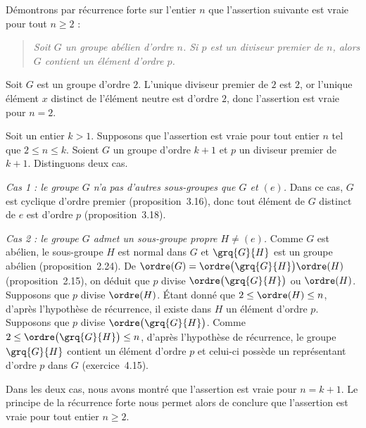
Démontrons par récurrence forte sur l'entier $n$ que l'assertion suivante est vraie pour tout $n \geq 2$ :
\begin{quote}\itshape
  Soit $G$ un groupe abélien d'ordre $n$.
  Si $p$ est un diviseur premier de $n$, alors $G$ contient un élément d'ordre $p$.
\end{quote}

Soit $G$ est un groupe d'ordre $2$.
L'unique diviseur premier de $2$ est $2$, or l'unique élément $x$ distinct de l'élément neutre est d'ordre $2$, donc l'assertion est vraie pour $n = 2$.

Soit un entier $k > 1$.
Supposons que l'assertion est vraie pour tout entier $n$ tel que $2\leq n\leq k$.
Soient $G$ un groupe d'ordre $k + 1$ et $p$ un diviseur premier de $k + 1$.
Distinguons deux cas.

\textit{Cas 1 : le groupe $G$ n'a pas d'autres sous-groupes que $G$ et $(e)$.}
Dans ce cas, $G$ est cyclique d'ordre premier (proposition~3.16), donc tout élément de $G$ distinct de $e$ est d'ordre $p$ (proposition~3.18).

\textit{Cas 2 : le groupe $G$ admet un sous-groupe propre $H\neq (e)$.}
Comme $G$ est abélien, le sous-groupe $H$ est normal dans $G$ et $\grq{G}{H}$ est un groupe abélien (proposition~2.24).
De $\ordre(G) = \ordre\bigl(\grq{G}{H}\bigr)\ordre(H)$ (proposition~2.15), on déduit que $p$ divise $\ordre\bigl(\grq{G}{H}\bigr)$ ou $\ordre(H)$.
Supposons que $p$ divise $\ordre(H)$.
Étant donné que $2\leq\ordre(H)\leq n$, d'après l'hypothèse de récurrence, il existe dans $H$ un élément d'ordre $p$.
Supposons que $p$ divise $\ordre\bigl(\grq{G}{H}\bigr)$.
Comme $2\leq\ordre\bigl(\grq{G}{H}\bigr)\leq n$, d'après l'hypothèse de récurrence, le groupe $\grq{G}{H}$ contient un élément d'ordre $p$ et celui-ci possède un représentant d'ordre $p$ dans $G$ (exercice~4.15).

Dans les deux cas, nous avons montré que l'assertion est vraie pour $n = k + 1$.
Le principe de la récurrence forte nous permet alors de conclure que l'assertion est vraie pour tout entier $n\geq 2$.
